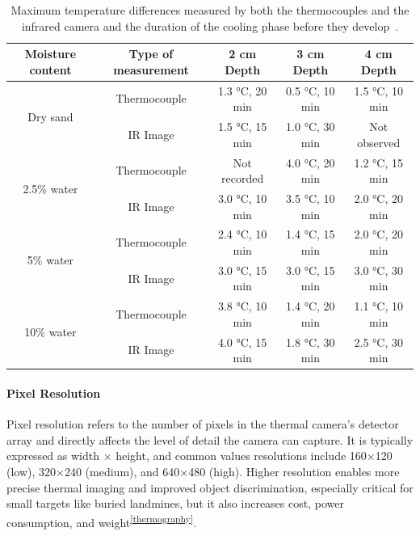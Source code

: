 \begin{table}[H]
    \centering
    \caption{Maximum temperature differences measured by both the thermocouples and the infrared camera and the duration of the cooling phase before they develop~\cite{lamorski2002thermal}.}
    \label{tab:netd_table}
    \scriptsize
    \begin{tabular}{ccccc}
        \toprule
        \textbf{Moisture content} & \textbf{Type of measurement} & \textbf{2 cm Depth} & \textbf{3 cm Depth} & \textbf{4 cm Depth} \\
        \midrule
        \multirow{2}{*}{Dry sand} 
            & Thermocouple & 1.3 °C, 20 min & 0.5 °C, 10 min & 1.5 °C, 10 min \\
            & IR Image     & 1.5 °C, 15 min & 1.0 °C, 30 min & Not observed \\
        \midrule
        \multirow{2}{*}{2.5\% water} 
            & Thermocouple & Not recorded   & 4.0 °C, 20 min & 1.2 °C, 15 min \\
            & IR Image     & 3.0 °C, 10 min & 3.5 °C, 10 min & 2.0 °C, 20 min \\
        \midrule
        \multirow{2}{*}{5\% water} 
            & Thermocouple & 2.4 °C, 10 min & 1.4 °C, 15 min & 2.0 °C, 20 min \\
            & IR Image     & 3.0 °C, 15 min & 3.0 °C, 15 min & 3.0 °C, 30 min \\
        \midrule
        \multirow{2}{*}{10\% water} 
            & Thermocouple & 3.8 °C, 10 min & 1.4 °C, 20 min & 1.1 °C, 10 min \\
            & IR Image     & 4.0 °C, 15 min & 1.8 °C, 30 min & 2.5 °C, 30 min \\
        \bottomrule
    \end{tabular}
\end{table}


\paragraph{Pixel Resolution}
Pixel resolution refers to the number of pixels in the thermal camera’s detector array and directly affects the level of detail the camera can capture. It is typically expressed as width × height, and common values resolutions include 160×120 (low), 320×240 (medium), and 640×480 (high). Higher resolution enables more precise thermal imaging and improved object discrimination, especially critical for small targets like buried landmines, but it also increases cost, power consumption, and weight\textsuperscript{\ref{thermography}}. 


